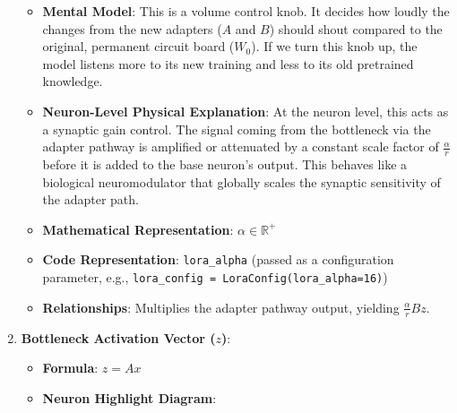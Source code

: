 \begin{enumerate}
\begin{itemize}
      \item \textbf{Mental Model}: This is a volume control knob. It decides how loudly the changes from the new adapters ($A$ and $B$) should shout compared to the original, permanent circuit board ($W_0$). If we turn this knob up, the model listens more to its new training and less to its old pretrained knowledge.
      \item \textbf{Neuron-Level Physical Explanation}: At the neuron level, this acts as a synaptic gain control. The signal coming from the bottleneck via the adapter pathway is amplified or attenuated by a constant scale factor of $\frac{\alpha}{r}$ before it is added to the base neuron's output. This behaves like a biological neuromodulator that globally scales the synaptic sensitivity of the adapter path.
      \item \textbf{Mathematical Representation}: $\alpha \in \mathbb{R}^{+}$
      \item \textbf{Code Representation}: \texttt{lora\_alpha} (passed as a configuration parameter, e.g., \texttt{lora\_config = LoraConfig(lora\_alpha=16)})
      \item \textbf{Relationships}: Multiplies the adapter pathway output, yielding $\frac{\alpha}{r} B z$.
    \end{itemize}

  \item \textbf{Bottleneck Activation Vector ($z$)}:
    \begin{itemize}
      \item \textbf{Formula}: $z = Ax$
      \item \textbf{Neuron Highlight Diagram}:

\begin{center}
\begin{adjustbox}{max width=0.85\linewidth}
\end{adjustbox}
\end{center}
\end{itemize}
\end{enumerate}

